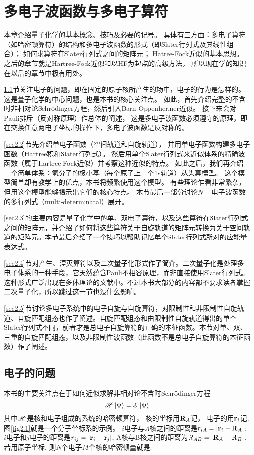 
\chapter{多电子波函数与多电子算符}
\label{chap2}
本章介绍量子化学的基本概念、技巧及必要的记号。
具体有三方面：多电子算符（如哈密顿算符）的结构和多电子波函数的形式（即Slater行列式及其线性组合）；
如何求算符在Slater行列式之间的矩阵元；
Hatree-Fock近似的基本思想。
之后的章节就是Hartree-Fock近似和以HF为起点的高级方法，
所以现在学的知识在以后的章节中极有用处。


\ref{sec2.1}节关注电子的问题，即在固定的原子核所产生的场中，电子的行为是怎样的。
这是量子化学的中心问题，也是本书的核心关注点。
如此，首先介绍完整的不含时非相对论Schr\"odinger方程，然后引入Born-Oppenhermer近似。
接下来会对Pauli排斥（反对称原理）作总体的阐述，
这是多电子波函数必须遵守的原理，即在交换任意两电子坐标的操作下，多电子波函数是反对称的。

\ref{sec2.2}节先介绍单电子函数（空间轨道和自旋轨道），
并用单电子函数构建多电子函数（Hartree积和Slater行列式）。
然后用单个Slater行列式来近似体系的精确波函数（属于Hartree-Fock近似）并考察这种近似的特点。
如此之后，我们再介绍一个简单体系：氢分子的极小基（每个原子上一个1s轨道）从头算模型。
这个模型简单却有教学上的优点，本书将频繁使用这个模型。
有些理论乍看非常繁杂，但用这个模型能够揭示出它们的核心特点。
本节最后一部分讨论$N-$电子波函数的多行列式（multi-determinatal）展开。

\ref{sec2.3}的主要内容是量子化学中的单、双电子算符，以及这些算符在Slater行列式之间的矩阵元，并介绍了如何将这些算符关于自旋轨道的矩阵元转换为关于空间轨道的矩阵元。本节最后介绍了一个技巧以帮助记忆单个Slater行列式所对的应能量表达式。

\ref{sec2.4}节对产生、湮灭算符以及二次量子化形式作了简介。二次量子化是处理多电子体系的一种手段，它天然蕴含Pauli不相容原理，而非直接使用Slater行列式。这种形式广泛出现在多体理论的文献中。不过本书大部分的内容都不要求读者掌握二次量子化，所以跳过这一节也没什么影响。

\ref{sec2.5}节讨论多电子系统中的电子自旋与自旋算符，对限制性和非限制性自旋轨道、自旋匹配组态也作了阐述。自旋匹配组态和由限制性自旋轨道得出的单个Slater行列式不同，前者才是总电子自旋算符的正确的本征函数。本节对单、双、三重的自旋匹配组态，以及非限制性波函数（此函数不是总电子自旋算符的本征函数）作了阐述。

\section{电子的问题}
\label{sec2.1}
本书的主要关注点在于如何近似求解非相对论不含时Schr\"odinger方程
\begin{equation}
\label{2.1}
\mathscr{H}\Ket{\Phi}=\mathscr{E}\Ket{\Phi}
\end{equation}
其中$\mathscr{H}$是核和电子组成的系统的哈密顿算符，
核的坐标用$\mathbf{R}_A$记，
电子的用$\mathbf{r}_i$记. 
图\ref{fig2.1}就是一个分子坐标系的示例。
$i$电子与$A$核之间的距离是$r_{iA}=|\mathbf{r}_i-\mathbf{R}_A|$; 
$i$电子和$j$电子的距离是$r_{ij}=|\mathbf{r}_i-\mathbf{r}_j|$, 
A核与B核之间的距离为$R_{AB}=|\mathbf{R}_A-\mathbf{R}_B|$.
若用原子坐标,
则$N$个电子$M$个核的哈密顿量就是:

